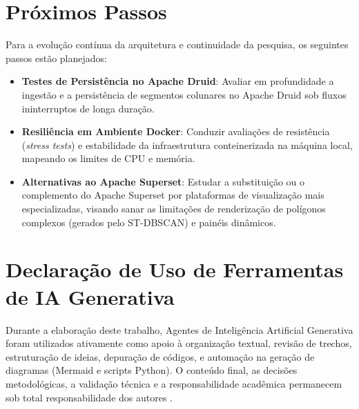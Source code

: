 \documentclass[12pt]{article}
\begin{document}
\section{Próximos Passos}

Para a evolução contínua da arquitetura e continuidade da pesquisa, os seguintes passos estão planejados:
\begin{itemize}
    \item \textbf{Testes de Persistência no Apache Druid}: Avaliar em profundidade a ingestão e a persistência de segmentos colunares no Apache Druid sob fluxos ininterruptos de longa duração.
    \item \textbf{Resiliência em Ambiente Docker}: Conduzir avaliações de resistência (\textit{stress tests}) e estabilidade da infraestrutura conteinerizada na máquina local, mapeando os limites de CPU e memória.
    \item \textbf{Alternativas ao Apache Superset}: Estudar a substituição ou o complemento do Apache Superset por plataformas de visualização mais especializadas, visando sanar as limitações de renderização de polígonos complexos (gerados pelo ST-DBSCAN) e painéis dinâmicos.
\end{itemize}

\section*{Declaração de Uso de Ferramentas de IA Generativa}

Durante a elaboração deste trabalho, Agentes de Inteligência Artificial Generativa foram utilizados ativamente como apoio à organização textual, revisão de trechos, estruturação de ideias, depuração de códigos, e automação na geração de diagramas (Mermaid e scripts Python). O conteúdo final, as decisões metodológicas, a validação técnica e a responsabilidade acadêmica permanecem sob total responsabilidade dos autores \cite{openai_chatgpt}.



\end{document}
